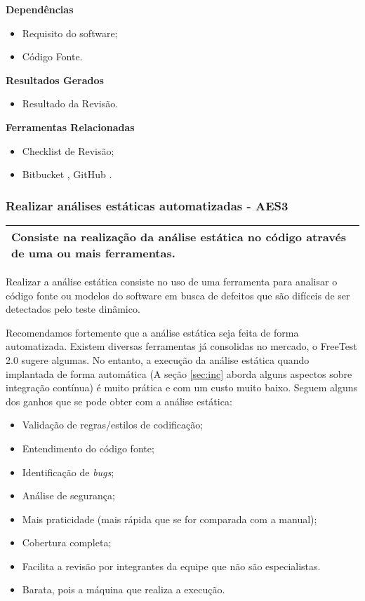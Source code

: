 \textbf{ Dependências }
\begin{itemize}
    \item Requisito do software;
    \item Código Fonte.
\end{itemize}

\textbf{ Resultados Gerados }
\begin{itemize}
    \item Resultado da Revisão.
\end{itemize}

\textbf{ Ferramentas Relacionadas }
\begin{itemize}
    \item Checklist de Revisão;
    \item Bitbucket \cite{Bitbucket}, GitHub \cite{GitHub}.
\end{itemize}

\subsubsection{Realizar análises estáticas automatizadas - AES3}
\label{sec:aes3}

\begin{table}[H]
\centering
\begin{tabular}{|p{130mm}|}
\hline
Consiste na realização da análise estática no código através de uma ou mais ferramentas. \\
\hline
\end{tabular}
\end{table}

Realizar a análise estática consiste no uso de uma ferramenta para analisar o código fonte ou modelos do software em busca de defeitos que são difíceis de ser detectados pelo teste dinâmico.

Recomendamos fortemente que a análise estática seja feita de forma automatizada. Existem diversas ferramentas já consolidas no mercado, o FreeTest 2.0 sugere algumas. No entanto, a execução da análise estática quando implantada de forma automática (A seção \ref{sec:inc} aborda alguns aspectos sobre integração contínua) é muito prática e com um custo muito baixo. Seguem alguns dos ganhos que se pode obter com a análise estática:

\begin{itemize}
    \item Validação de regras/estilos de codificação;
    \item Entendimento do código fonte;
    \item Identificação de \textit{bugs};
    \item Análise de segurança;
    \item Mais praticidade (mais rápida que se for comparada com a manual);
    \item Cobertura completa;
    \item Facilita a revisão por integrantes da equipe que não são especialistas.
    \item Barata, pois a máquina que realiza a execução.
\end{itemize}

